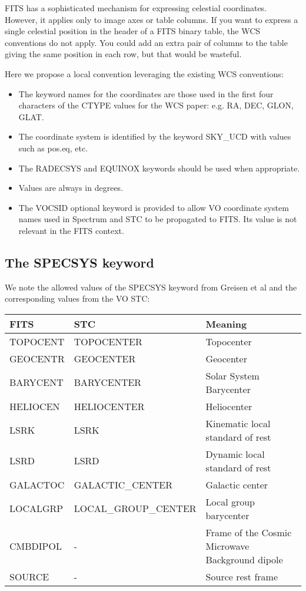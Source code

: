 FITS has a sophisticated mechanism for expressing celestial
coordinates. However, it applies only to image axes or table
columns. If you want to express a single celestial position in the
header of a FITS binary table, the WCS conventions do not apply.
You could add an extra pair of columns to the table giving the
same position in each row, but that would be wasteful.

Here we propose a local convention leveraging the existing
WCS conventions:
\begin{itemize}
\item The keyword names for the coordinates are those used
in the first four characters of the CTYPE values for the WCS paper:
e.g. RA, DEC, GLON, GLAT.
\item The coordinate system is identified by the keyword SKY\_UCD with
values such as pos.eq, etc.
\item The RADECSYS and EQUINOX keywords should be used when appropriate.
\item Values are always in degrees.
\item The VOCSID optional keyword is provided to allow VO coordinate
system names used in Spectrum and STC to be propagated to FITS.
Its value is not relevant in the FITS context.
\end{itemize}



\subsection{The SPECSYS keyword}

We note the allowed values of the SPECSYS keyword from
Greisen et al and the corresponding values from the VO STC:

\vskip 0.1in

\colorbox{iblue}{
\begin{tabular}{lll}
\hline
FITS   & STC   & Meaning\\
\hline
TOPOCENT &TOPOCENTER & Topocenter\\
GEOCENTR &GEOCENTER & Geocenter\\
BARYCENT &BARYCENTER & Solar System Barycenter\\
HELIOCEN &HELIOCENTER & Heliocenter\\
LSRK     &LSRK & Kinematic local standard of rest\\
LSRD     &LSRD & Dynamic local standard of rest\\
GALACTOC &GALACTIC\_CENTER & Galactic center\\
LOCALGRP &LOCAL\_GROUP\_CENTER & Local group barycenter\\
CMBDIPOL &- & Frame of the Cosmic Microwave Background dipole\\
SOURCE   &- & Source rest frame \\
\hline
\end{tabular}
}

